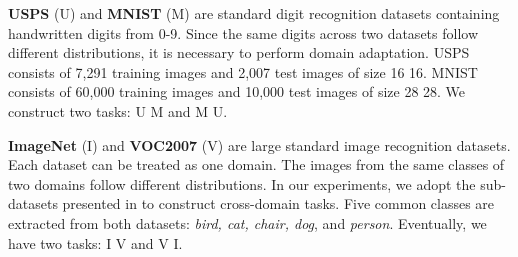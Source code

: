 \documentclass[sigconf]{acmart}
\begin{document}
\textbf{USPS} (U) and \textbf{MNIST} (M) are standard digit recognition datasets containing handwritten digits from 0-9. Since the same digits across two datasets follow different distributions, it is necessary to perform domain adaptation. USPS consists of 7,291 training images and 2,007 test images of size 16  16. MNIST consists of 60,000 training images and 10,000 test images of size 28  28. We construct two tasks: U  M and M  U. 

\textbf{ImageNet} (I) and \textbf{VOC2007} (V) are large standard image recognition datasets. Each dataset can be treated as one domain. The images from the same classes of two domains follow different distributions. In our experiments, we adopt the sub-datasets presented in \cite{fang2013unbiased} to construct cross-domain tasks. Five common classes are extracted from both datasets: \textit{bird, cat, chair, dog}, and \textit{person}. Eventually, we have two tasks: I  V and V  I.
 
\begin{table}[t!]
	\centering
	\vspace{-.1in}
	\caption{Statistics of the seven benchmark datasets.}
	\vspace{-.15in}
	\label{tb-dataset}
\vspace{-.15in}
\end{table}
\end{document}
